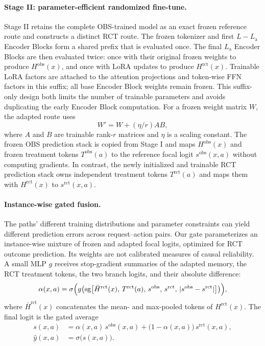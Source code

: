 \documentclass[sigconf,nonacm]{acmart}
\begin{document}
\paragraph{Stage II: parameter-efficient randomized fine-tune.}
Stage II retains the complete OBS-trained model as an exact frozen reference route and constructs a distinct RCT route. The frozen tokenizer and first $L-L_{\mathrm a}$ Encoder Blocks form a shared prefix that is evaluated once. The final $L_{\mathrm a}$ Encoder Blocks are then evaluated twice: once with their original frozen weights to produce $H^{\mathrm{obs}}(x)$, and once with LoRA updates to produce $H^{\mathrm{rct}}(x)$. Trainable LoRA factors are attached to the attention projections and token-wise FFN factors in this suffix; all base Encoder Block weights remain frozen. This suffix-only design both limits the number of trainable parameters and avoids duplicating the early Encoder Block computation. For a frozen weight matrix $W$, the adapted route uses
\begin{equation}
   W' = W + (\eta / r) AB,
\end{equation}
where $A$ and $B$ are trainable rank-$r$ matrices and $\eta$ is a scaling constant. The frozen OBS prediction stack is copied from Stage I and maps $H^{\mathrm{obs}}(x)$ and frozen treatment tokens $T^{\mathrm{obs}}(a)$ to the reference focal logit $s^{\mathrm{obs}}(x,a)$ without computing gradients. In contrast, the newly initialized and trainable RCT prediction stack owns independent treatment tokens $T^{\mathrm{rct}}(a)$ and maps them with $H^{\mathrm{rct}}(x)$ to $s^{\mathrm{rct}}(x,a)$.

\paragraph{Instance-wise gated fusion.}
The paths' different training distributions and parameter constraints can yield different prediction errors across request--action pairs. Our gate parameterizes an instance-wise mixture of frozen and adapted focal logits, optimized for RCT outcome prediction. Its weights are not calibrated measures of causal reliability. A small MLP $g$ receives stop-gradient summaries of the adapted memory, the RCT treatment tokens, the two branch logits, and their absolute difference:
\begin{equation}
   \alpha(x,a) =
   \sigma\Bigl(
   g\bigl(
   \mathrm{sg}\bigl[
   \bar H^{\mathrm{rct}}(x),\,
   T^{\mathrm{rct}}(a),\,
   s^{\mathrm{obs}},\,
   s^{\mathrm{rct}},\,
   |s^{\mathrm{obs}}-s^{\mathrm{rct}}|
   \bigr]
   \bigr)
   \Bigr),
\end{equation}
where $\bar H^{\mathrm{rct}}(x)$ concatenates the mean- and max-pooled tokens of $H^{\mathrm{rct}}(x)$. The final logit is the gated average
\begin{equation}
   \label{eq:gated-fusion}
   \begin{aligned}
   s(x,a) &=
   \alpha(x,a)\,s^{\mathrm{obs}}(x,a)
   + \bigl(1-\alpha(x,a)\bigr)\,s^{\mathrm{rct}}(x,a),\\
   \hat y(x,a) &= \sigma\bigl(s(x,a)\bigr).
   \end{aligned}
\end{equation}
\end{document}
